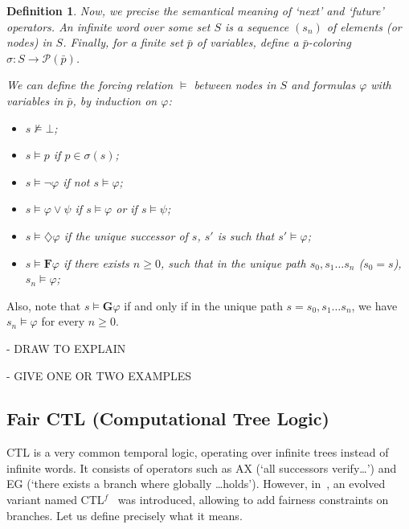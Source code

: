 \documentclass[11pt]{article}
\newcommand{\CTLf}{{CTL$^f$ }}
\newcommand{\F}{{\mathbf{F}}}
\newcommand{\phii}{{\varphi}}
\newcommand{\G}{{\mathbf{G}}}
\newcommand{\dia}{{\diamondsuit}}
\newtheorem*{definition}{Definition}
\begin{document}
\begin{definition}\label{infinite word}
    Now, we precise the semantical meaning of `next' and `future' operators.
    An \emph{infinite word} over some set $S$ is a sequence $(s_n)$ of 
    elements (or \emph{nodes}) in $S$. 
    Finally, for a finite set $\bar{p}$ of
    variables, define a \emph{$\bar{p}$-coloring} $\sigma : S \to \mathcal{P}(\bar{p})$.

    We can define the forcing relation $\models$ between nodes in $S$ and formulas $\phii$ with 
    variables in $\bar{p}$, by induction on $\phii$:
    \begin{itemize}
        \setlength\itemsep{0em}
        \item[-] $s\not\models \bot$;
        \item[-] $s \models p$ if $p \in \sigma(s)$;
        \item[-] $s \models \neg\phii$ if not $s \models \phii$;
        \item[-] $s \models \phii \vee \psi$ if $s\models \phii$ or if $s\models \psi$;
        \item[-] $s\models \dia\phii$ if the unique successor of $s$, $s'$ is such that
             $s'\models \phii$;
        \item[-] $s\models \F\phii$ if there exists $n\geq 0$, such that in the unique path 
            $s_0,s_1\ldots s_n$ ($s_0=s$), $s_n\models\phii$;      
    \end{itemize}

\end{definition}

Also, note that $s\models \G\phii$ if and only if in the unique path $s=s_0,s_1\ldots s_n$, we have
$s_n\models\phii$ for every $n\geq 0$.

- DRAW TO EXPLAIN

- GIVE ONE OR TWO EXAMPLES




\subsection{Fair CTL (Computational Tree Logic)}
CTL is a very common temporal logic, operating over infinite trees instead of infinite words.
It consists of operators such as AX (`all successors verify\ldots') and EG
(`there exists a branch where globally \ldots holds'). However, in~\cite{GhivG16}, an evolved variant named
\CTLf~was introduced, allowing to add fairness constraints on branches. Let us define precisely
what it means.
\end{document}

